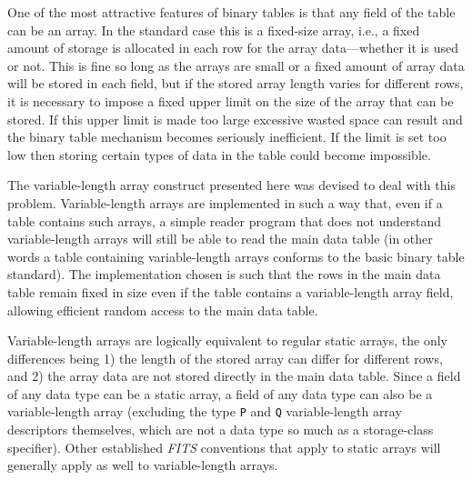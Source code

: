 \documentclass[onecolumn]{aa}
\begin{document}
    One of the most attractive features of binary tables is that any
field of the table can be an array.  In the standard case this is a
fixed-size array, i.e., a fixed amount of storage is allocated in each
row for the array data---whether it is used or not.  This is fine
so long as the arrays are small or a fixed amount of array data will
be stored in each field, but if the stored array length varies for
different rows, it is necessary to impose a fixed upper limit on
the size of the array that can be stored.  If this upper limit is made
too large excessive wasted space can result and the binary table
mechanism becomes seriously inefficient.  If the limit is set too low
then storing certain types of data in the table could become impossible.

The variable-length array construct
presented here was devised to
deal with this problem.  Variable-length arrays are implemented in
such a way that, even if a table contains such arrays, a simple reader
program that does not understand variable-length arrays will still be
able to read the main data table (in other words a table containing
variable-length arrays conforms to the basic binary table standard).
The implementation chosen is such that the rows in the main data table
remain fixed in size even if the table contains a variable-length
array field, allowing efficient random access to the main data table.

Variable-length arrays are logically equivalent to regular static
arrays, the only differences being 1) the length of the stored array
can differ for different rows, and 2) the array data are not stored
directly in the main data table.  Since a field of any data type can be a
static array, a field of any data type can also be a variable-length
array (excluding the type {\tt P} and {\tt Q} variable-length array descriptors
themselves, which are not a data type so much as a storage-class specifier).
Other established {\em FITS\/} conventions that apply to static arrays will
generally apply as well to variable-length arrays.
\end{document}
